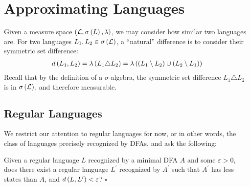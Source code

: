 \section{Approximating Languages}
Given a measure space
\(\left(\mathcal{L}, \sigma\left(L\right), \lambda\right)\),
we may consider how similar two languages are.
For two languages \(L_1, L_2 \in \sigma\left(\mathcal{L}\right)\),
a ``natural'' difference is to consider their
symmetric set difference:
\begin{align*}
  d\left(L_1, L_2\right)
    = \lambda\left(L_1 \triangle L_2\right)
    = \lambda\left(\left(L_1 \setminus L_2\right) \cup \left(L_2 \setminus L_1\right)\right)
\end{align*}
Recall that by the definition of a \(\sigma\)-algebra,
the symmetric set difference \(L_1 \triangle L_2\)
is in \(\sigma\left(\mathcal{L}\right)\), and therefore measurable.


\subsection{Regular Languages}
We restrict our attention to regular languages for now,
or in other words, the class of languages precisely recognized by
DFAs, and ask the following:

\begin{question}
  Given a regular language \(L\) recognized by a minimal DFA \(A\)
  and some \(\varepsilon > 0\),
  does there exist a regular language \(L^\prime\) recognized by \(A^\prime\)
  such that \(A^\prime\) has less states than \(A\),
  and \(d\left(L, L^\prime\right) < \varepsilon\)?
  \hfill\(\square\)
\end{question}


